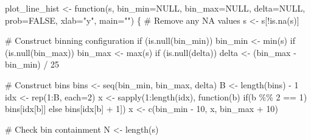 \documentclass[
  letterpaper,
  DIV=11,
  numbers=noendperiod]{scrartcl}
\newenvironment{Shaded}{\begin{snugshade}}{\end{snugshade}}
\newcommand{\AttributeTok}[1]{\textcolor[rgb]{0.40,0.45,0.13}{#1}}
\newcommand{\CommentTok}[1]{\textcolor[rgb]{0.37,0.37,0.37}{#1}}
\newcommand{\ConstantTok}[1]{\textcolor[rgb]{0.56,0.35,0.01}{#1}}
\newcommand{\ControlFlowTok}[1]{\textcolor[rgb]{0.00,0.23,0.31}{#1}}
\newcommand{\DecValTok}[1]{\textcolor[rgb]{0.68,0.00,0.00}{#1}}
\newcommand{\FunctionTok}[1]{\textcolor[rgb]{0.28,0.35,0.67}{#1}}
\newcommand{\NormalTok}[1]{\textcolor[rgb]{0.00,0.23,0.31}{#1}}
\newcommand{\OtherTok}[1]{\textcolor[rgb]{0.00,0.23,0.31}{#1}}
\newcommand{\SpecialCharTok}[1]{\textcolor[rgb]{0.37,0.37,0.37}{#1}}
\newcommand{\StringTok}[1]{\textcolor[rgb]{0.13,0.47,0.30}{#1}}
\begin{document}
\begin{Shaded}
\begin{Highlighting}[]
\NormalTok{plot\_line\_hist }\OtherTok{\textless{}{-}} \ControlFlowTok{function}\NormalTok{(s, }\AttributeTok{bin\_min=}\ConstantTok{NULL}\NormalTok{, }\AttributeTok{bin\_max=}\ConstantTok{NULL}\NormalTok{, }\AttributeTok{delta=}\ConstantTok{NULL}\NormalTok{,}
                           \AttributeTok{prob=}\ConstantTok{FALSE}\NormalTok{, }\AttributeTok{xlab=}\StringTok{"y"}\NormalTok{, }\AttributeTok{main=}\StringTok{""}\NormalTok{) \{}
  \CommentTok{\# Remove any NA values}
\NormalTok{  s }\OtherTok{\textless{}{-}}\NormalTok{ s[}\SpecialCharTok{!}\FunctionTok{is.na}\NormalTok{(s)]}

  \CommentTok{\# Construct binning configuration}
  \ControlFlowTok{if}\NormalTok{ (}\FunctionTok{is.null}\NormalTok{(bin\_min))}
\NormalTok{    bin\_min }\OtherTok{\textless{}{-}} \FunctionTok{min}\NormalTok{(s)}
  \ControlFlowTok{if}\NormalTok{ (}\FunctionTok{is.null}\NormalTok{(bin\_max))}
\NormalTok{    bin\_max }\OtherTok{\textless{}{-}} \FunctionTok{max}\NormalTok{(s)}
  \ControlFlowTok{if}\NormalTok{ (}\FunctionTok{is.null}\NormalTok{(delta))}
\NormalTok{    delta }\OtherTok{\textless{}{-}}\NormalTok{ (bin\_max }\SpecialCharTok{{-}}\NormalTok{ bin\_min) }\SpecialCharTok{/} \DecValTok{25}

  \CommentTok{\# Construct bins}
\NormalTok{  bins }\OtherTok{\textless{}{-}} \FunctionTok{seq}\NormalTok{(bin\_min, bin\_max, delta)}
\NormalTok{  B }\OtherTok{\textless{}{-}} \FunctionTok{length}\NormalTok{(bins) }\SpecialCharTok{{-}} \DecValTok{1}
\NormalTok{  idx }\OtherTok{\textless{}{-}} \FunctionTok{rep}\NormalTok{(}\DecValTok{1}\SpecialCharTok{:}\NormalTok{B, }\AttributeTok{each=}\DecValTok{2}\NormalTok{)}
\NormalTok{  x }\OtherTok{\textless{}{-}} \FunctionTok{sapply}\NormalTok{(}\DecValTok{1}\SpecialCharTok{:}\FunctionTok{length}\NormalTok{(idx),}
              \ControlFlowTok{function}\NormalTok{(b) }\ControlFlowTok{if}\NormalTok{(b }\SpecialCharTok{\%\%} \DecValTok{2} \SpecialCharTok{==} \DecValTok{1}\NormalTok{) bins[idx[b]] }\ControlFlowTok{else}\NormalTok{ bins[idx[b] }\SpecialCharTok{+} \DecValTok{1}\NormalTok{])}
\NormalTok{  x }\OtherTok{\textless{}{-}} \FunctionTok{c}\NormalTok{(bin\_min }\SpecialCharTok{{-}} \DecValTok{10}\NormalTok{, x, bin\_max }\SpecialCharTok{+} \DecValTok{10}\NormalTok{)}

  \CommentTok{\# Check bin containment}
\NormalTok{  N }\OtherTok{\textless{}{-}} \FunctionTok{length}\NormalTok{(s)}


\end{Highlighting}
\end{Shaded}
\end{document}
